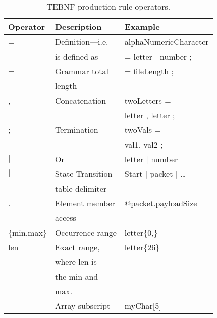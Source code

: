 \begin{table}[h]
\begin{center}
\caption{TEBNF production rule operators.}
\label{TEBNFProductionRuleOperators}
\begin{tabular}{|l|l|l|} \hline
\textbf{Operator} & \textbf{Description} & \textbf{Example} \\ \hline \hline
=   & Definition$—$i.e. & alphaNumericCharacter \\
    & is defined as     & = letter $|$ number ;  \\ \hline
=   & Grammar total     & = fileLength ; \\
    & length            &                \\ \hline
,   & Concatenation	    & twoLetters =      \\
    &                   & letter , letter ; \\ \hline
;   & Termination       & twoVals =    \\
    &                   & val1, val2 ; \\ \hline
$|$   & Or	            & letter $|$ number \\ \hline
$|$   & State Transition  & Start $|$ packet $|$ … \\
    & table delimiter   &                    \\ \hline
.   & Element member    & @packet.payloadSize \\
    & access            &                     \\ \hline
\{min,max\} & Occurrence range & letter\{0,\} \\ \hline
{len}     & Exact range,  & letter\{26\} \\
          & where len is  &            \\
          & the min and   &            \\
          & max.          &            \\ \hline
[\ ]      & Array subscript	& myChar[5] \\ \hline
\end{tabular}
\end{center}
\end{table}

